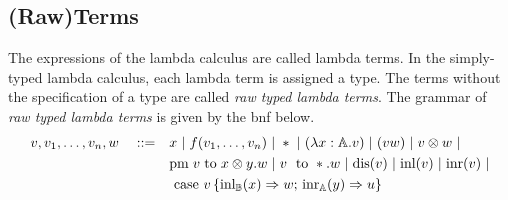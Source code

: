 \subsection{(Raw)Terms}


The expressions of the lambda calculus are called lambda terms. In the simply-typed lambda calculus, each lambda term is assigned a type. The terms without the specification of a type are called \emph{raw typed lambda terms}. The grammar of \emph{raw typed lambda terms} is given by the \acrshort{bnf} below.
\begin{equation*} \label{eq:grammarlambda}
\begin{split}
 v,v_1, \ldots, v_n,w \hspace{10 pt} ::= \hspace{10 pt}& x \hspace{3 pt} \vert \hspace{3 pt} f(v_1, \ldots, v_n) \hspace{3 pt} \vert \hspace{3 pt} *  \hspace{3 pt} \vert \hspace{3 pt} (\lambda x: \mathbb{A}. v )\hspace{3 pt} \vert \hspace{3 pt} (v w) \hspace{3 pt}  \vert \hspace{3 pt} v \otimes w \hspace{3 pt} \vert
 \\&    \text{pm} \hspace{3 pt} v \hspace{3 pt} \text{to} \hspace{3 pt} x \otimes y. w  \hspace{3 pt}  \vert \hspace{3 pt} v \hspace{3 pt} \text{ to } *.w \hspace{3 pt} \vert \hspace{3 pt} \text{dis}(v) \hspace{3 pt} \vert \hspace{3 pt} \text{inl} (v) \hspace{3 pt} \vert \hspace{3 pt} \text{inr} (v) \hspace{3 pt} \vert
 \\& \text{ case } v \,   \{\text{inl}_{\mathbb{B}} (x) \Rightarrow w ; \, \text{inr}_{\mathbb{A}} (y) \Rightarrow u\}
\end{split}
\end{equation*}

